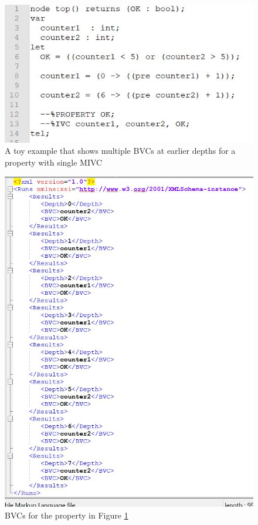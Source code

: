 \begin{figure}
 \centering
  \includegraphics[width=0.8\columnwidth]{figs/toybvc.jpg}
  \caption{A toy example that shows multiple BVCs at earlier depths for a property with single MIVC}
  \vspace{0.1in}
  \label{fig:toybvc}
\end{figure}

\begin{figure}
 \centering
  \includegraphics[width=0.8\columnwidth]{figs/toyo1.jpg}
  \caption{BVCs for the property in Figure \ref{fig:toybvc}}
  \vspace{0.1in}
  \label{fig:toyo1}
\end{figure}



